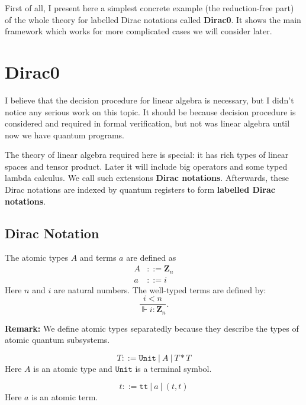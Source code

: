   
% 

First of all, I present here a simplest concrete example (the reduction-free part) of the whole theory for labelled Dirac notations called \textbf{Dirac0}. It shows the main framework which works for more complicated cases we will consider later.

\section{Dirac0}

I believe that the decision procedure for linear algebra is necessary, but I didn't notice any serious work on this topic. It should be because decision procedure is considered and required in formal verification, but not was linear algebra until now we have quantum programs. 

The theory of linear algebra required here is special: it has rich types of linear spaces and tensor product. Later it will include big operators and some typed lambda calculus. We call such extensions \textbf{Dirac notations}. Afterwards, these Dirac notations are indexed by quantum registers to form \textbf{labelled Dirac notations}.

\subsection{Dirac Notation}

\begin{definition}
  The atomic types $A$ and terms $a$ are defined as
  \begin{align*}
    A & ::= \mathbf{Z}_n \\
    a & ::= i
  \end{align*}
  Here $n$ and $i$ are natural numbers. The well-typed terms are defined by:
  $$
  \frac{i < n}{\Vdash i : \mathbf{Z}_n}.
  $$
\end{definition}
\textbf{Remark:} We define atomic types separatedly because they describe the types of atomic quantum subsystems.

\begin{definition} 
  $$
  T ::= \texttt{Unit}\ |\ A\ |\ T * T
  $$
  Here $A$ is an atomic type and $\texttt{Unit}$ is a terminal symbol.
\end{definition}

\begin{definition}
  $$
  t ::= \texttt{tt}\ |\ a\ |\ (t, t)
  $$
  Here $a$ is an atomic term.
\end{definition}

